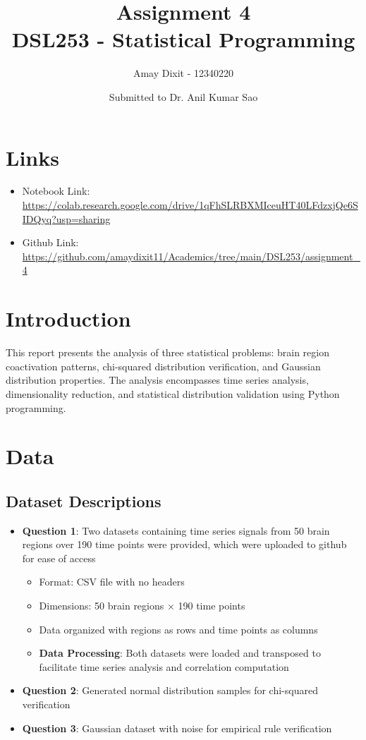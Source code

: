 \documentclass[12pt]{article}
\title{Assignment 4 \\ DSL253 - Statistical Programming}
\author{Amay Dixit - 12340220}
\date{Submitted to Dr. Anil Kumar Sao}
\begin{document}
\maketitle

\section*{Links}
\begin{sloppypar}
\begin{itemize}
    \item Notebook Link: \\ \url{https://colab.research.google.com/drive/1qFhSLRBXMIceuHT40LFdzxjQe6SIDQyq?usp=sharing}
    \item Github Link: \\ \url{https://github.com/amaydixit11/Academics/tree/main/DSL253/assignment_4}
\end{itemize}
\end{sloppypar}

\section{Introduction}
This report presents the analysis of three statistical problems: brain region coactivation patterns, chi-squared distribution verification, and Gaussian distribution properties. The analysis encompasses time series analysis, dimensionality reduction, and statistical distribution validation using Python programming.

\section{Data}
\subsection{Dataset Descriptions}
\begin{itemize}
    \item \textbf{Question 1}: Two datasets containing time series signals from 50 brain regions over 190 time points were provided, which were uploaded to github for ease of access
    \begin{itemize}
        \item Format: CSV file with no headers
        \item Dimensions: 50 brain regions × 190 time points
        \item Data organized with regions as rows and time points as columns        
        \item \textbf{Data Processing}: Both datasets were loaded and transposed to facilitate time series analysis and correlation computation
    \end{itemize}
    \item \textbf{Question 2}: Generated normal distribution samples for chi-squared verification
    \item \textbf{Question 3}: Gaussian dataset with noise for empirical rule verification
\end{itemize}
\end{document}
